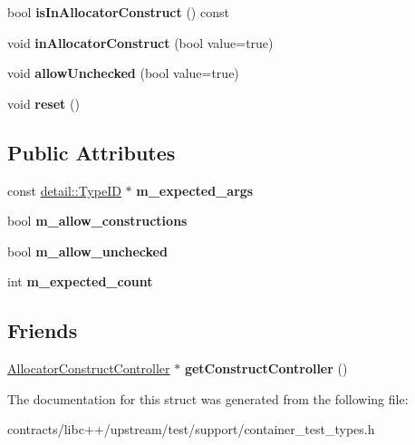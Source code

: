 \begin{DoxyCompactItemize}
\mbox{\label{struct_allocator_construct_controller_a92a00589d0c7cde3b4e080447fa68d27}} 
bool {\bfseries is\+In\+Allocator\+Construct} () const
\item 
\mbox{\label{struct_allocator_construct_controller_a3b1fbe2b91cdca329dac0c167a21d035}} 
void {\bfseries in\+Allocator\+Construct} (bool value=true)
\item 
\mbox{\label{struct_allocator_construct_controller_a4c2dfeb8dc6e6555861ae2f921a31ea4}} 
void {\bfseries allow\+Unchecked} (bool value=true)
\item 
\mbox{\label{struct_allocator_construct_controller_a670b25f5cc51a9ac1fbcf641e3009fdf}} 
void {\bfseries reset} ()
\end{DoxyCompactItemize}
\subsection*{Public Attributes}
\begin{DoxyCompactItemize}
\item 
\mbox{\label{struct_allocator_construct_controller_ae85b6a50e7aa4046d0f6b896286c0335}} 
const \mbox{\hyperlink{structdetail_1_1_type_i_d}{detail\+::\+Type\+ID}} $\ast$ {\bfseries m\+\_\+expected\+\_\+args}
\item 
\mbox{\label{struct_allocator_construct_controller_ac5917182fdecd25e4b6d352cbce1dabf}} 
bool {\bfseries m\+\_\+allow\+\_\+constructions}
\item 
\mbox{\label{struct_allocator_construct_controller_a7c9ba002b344569da312d65a99ed9b0e}} 
bool {\bfseries m\+\_\+allow\+\_\+unchecked}
\item 
\mbox{\label{struct_allocator_construct_controller_a4b5d5d605191f45715552725ec600727}} 
int {\bfseries m\+\_\+expected\+\_\+count}
\end{DoxyCompactItemize}
\subsection*{Friends}
\begin{DoxyCompactItemize}
\item 
\mbox{\label{struct_allocator_construct_controller_a013cbc0449be884954ef5915be15a661}} 
\mbox{\hyperlink{struct_allocator_construct_controller}{Allocator\+Construct\+Controller}} $\ast$ {\bfseries get\+Construct\+Controller} ()
\end{DoxyCompactItemize}


The documentation for this struct was generated from the following file\+:\begin{DoxyCompactItemize}
\item 
contracts/libc++/upstream/test/support/container\+\_\+test\+\_\+types.\+h\end{DoxyCompactItemize}
